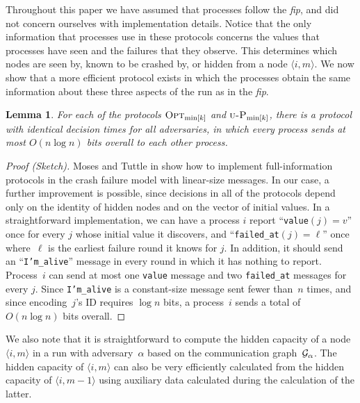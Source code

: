 \documentclass[11pt]{article}
\newtheorem{lemma}{Lemma}
\theoremstyle{definition}
\newcommand{\OptMink}{\mbox{$\mbox{\sc Opt}_{\min[k]}$}}
\newcommand{\UOptMink}{\mbox{$\mbox{\sc u-P}_{\min[k]}$}}
\newcommand{\CG}{{\cal G}}
\newcommand{\node}[1]{\langle#1\rangle}
\newcommand{\fip}{{\it fip}}
\begin{document}
Throughout this paper we have assumed that processes follow the \fip, and did not concern ourselves with implementation details. Notice that the only information that processes use in these protocols concerns the values that processes have seen and the failures that they observe. This determines which nodes are seen by, known to be crashed by, or hidden from a node $\node{i,m}$. We now show that a more efficient protocol exists in which the processes obtain the same information about these three aspects of the run as in the \fip.

\begin{lemma}
For each of the protocols $\OptMink$ and $\UOptMink$, there is a protocol with identical decision times for all adversaries, in which every process sends at most $O(n\log n)$ bits overall to each other process.
\end{lemma}

\begin{proof}[Proof (Sketch)]
Moses and Tuttle in \cite{MT} show how to implement full-information protocols in the crash failure model with linear-size messages. In our case, a further improvement is possible, since decisions in all of the protocols depend only on the identity of hidden nodes and on the vector of initial values. In a straightforward implementation, we can have a process $i$ report  ``{\tt value}$(j) = v$'' once for every $j$ whose initial value it discovers, and ``{\tt failed\_at}$(j) = \ell$'' once where~$\ell$ is the earliest failure round it knows for $j$. In addition, it should send an ``{\tt I'm\_alive}'' message in every round in which it has nothing to report. Process~$i$ can send at most one {\tt value} message and two
{\tt failed\_at} messages for every $j$. Since {\tt I'm\_alive} is a constant-size message sent fewer than~$n$ times, and since encoding~$j$'s ID requires $\log n$ bits, a process~$i$ sends a total of $O(n \log n)$ bits overall.
\end{proof}

We also note that it is straightforward to compute the hidden capacity of a node $\node{i,m}$
in a run with adversary~$\alpha$ based on the communication graph~$\CG_\alpha$. The hidden capacity
of $\node{i,m}$ can also be very efficiently calculated from the hidden capacity of $\node{i,m\!-\!1}$ using auxiliary
data calculated during the calculation of the latter.
\end{document}
